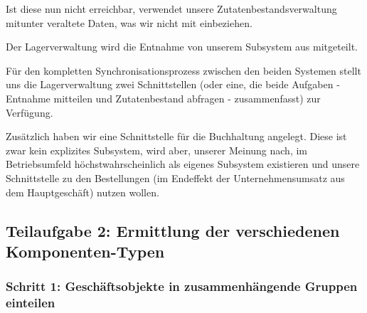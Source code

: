 Ist diese nun nicht erreichbar, verwendet unsere Zutatenbestandsverwaltung
mitunter veraltete Daten, was wir nicht mit einbeziehen.

Der Lagerverwaltung wird die Entnahme von unserem Subsystem aus mitgeteilt.

F\"ur den kompletten Synchronisationsprozess zwischen den beiden Systemen
stellt uns die Lagerverwaltung zwei Schnittstellen (oder eine, die beide
Aufgaben - Entnahme mitteilen und Zutatenbestand abfragen - zusammenfasst)
zur Verf\"ugung.

Zus\"atzlich haben wir eine Schnittstelle f\"ur die Buchhaltung angelegt.
Diese ist zwar kein explizites Subsystem, wird aber, unserer Meinung nach,
im Betriebsumfeld h\"ochstwahrscheinlich als eigenes Subsystem existieren
und unsere Schnittstelle zu den Bestellungen (im Endeffekt der Unternehmensumsatz 
aus dem Hauptgesch\"aft) nutzen wollen.



\subsection{Teilaufgabe 2: Ermittlung der verschiedenen Komponenten-Typen}

\subsubsection{Schritt 1: Gesch\"aftsobjekte in zusammenh\"angende Gruppen einteilen}
\label{gos}

